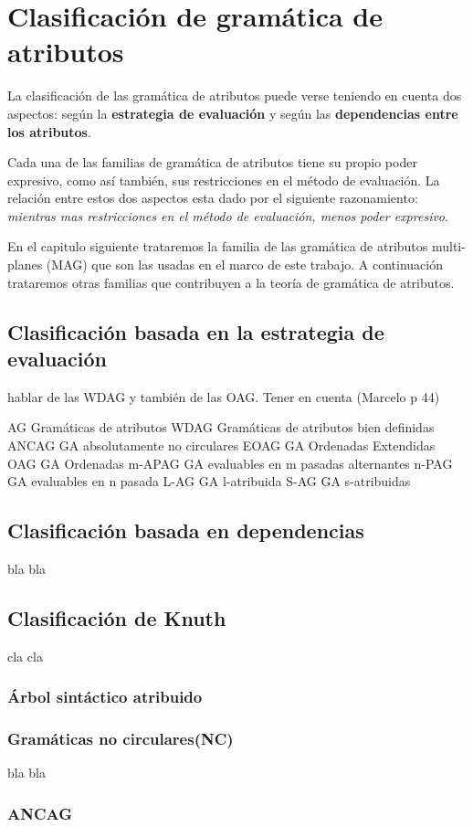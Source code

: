 \chapter{Clasificación de gramática de atributos}
\label{chap: clas_ag}
\minitoc

La clasificación de las gramática de atributos puede verse teniendo en cuenta dos aspectos: según la\textbf{ estrategia de evaluación} y según las \textbf{dependencias entre los atributos}. 

Cada una de las familias de gramática de atributos tiene su propio poder expresivo, como así también, sus restricciones en el método de evaluación. La relación entre estos dos aspectos esta dado por el siguiente razonamiento: \textit{mientras mas restricciones en el método de evaluación, menos poder expresivo}.

En el capitulo siguiente trataremos la familia de las gramática de atributos multi-planes (MAG) que son las usadas en el marco de este trabajo. A continuación trataremos otras familias que contribuyen a la teoría de gramática de atributos.

\section{Clasificación basada en la estrategia de evaluación}

hablar de las WDAG y también de las OAG. Tener en cuenta (Marcelo p 44)

        
AG      Gramáticas de atributos
WDAG    Gramáticas de atributos bien definidas   
ANCAG   GA absolutamente no circulares
EOAG    GA Ordenadas Extendidas
OAG     GA Ordenadas       
m-APAG  GA evaluables en m pasadas alternantes       
n-PAG   GA evaluables en n pasada       
L-AG    GA l-atribuida        
S-AG    GA s-atribuidas


\section{Clasificación basada en dependencias}

bla bla
\section{Clasificación de Knuth}

cla cla
\subsection{Árbol sintáctico atribuido}


\subsection{Gramáticas no circulares(NC)}
bla bla

\subsection{ANCAG}

